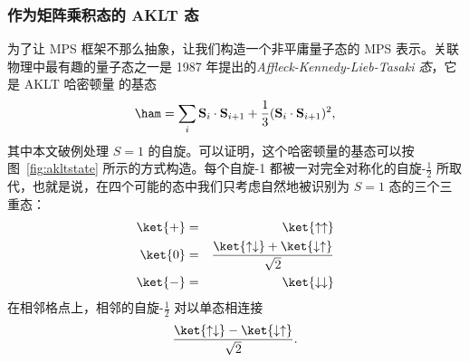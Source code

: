 \subsubsection{作为矩阵乘积态的 AKLT 态}
为了让 MPS 框架不那么抽象，让我们构造一个非平庸量子态的 MPS 表示。关联物理中最有趣的量子态之一是 1987 年提出的{\em Affleck-Kennedy-Lieb-Tasaki 态}，它是 AKLT 哈密顿量\cite{Affleck87,Affleck88} 的基态
\begin{equation}
\ham = \sum_{i} {\bf S}_i \cdot {\bf S}_{i+1} + 
\frac{1}{3} ({\bf S}_i \cdot {\bf S}_{i+1})^2 , 
\label{eq:aklt_hamiltonian}
\end{equation}
其中本文破例处理 $S=1$ 的自旋。可以证明，这个哈密顿量的基态可以按图~\ref{fig:akltstate} 所示的方式构造。每个自旋-1 都被一对完全对称化的自旋-$\frac{1}{2}$ 所取代，也就是说，在四个可能的态中我们只考虑自然地被识别为 $S=1$ 态的三个三重态：
\begin{eqnarray}
\ket{+}&=&\ket{\uparrow\uparrow} \nonumber \\
\ket{0}&=&\frac{\ket{\uparrow\downarrow}+\ket{\downarrow\uparrow}}{\sqrt{2}} 
\label{eq:tripletmapping} \\
\ket{-}&=&\ket{\downarrow\downarrow} \nonumber
\end{eqnarray}
在相邻格点上，相邻的自旋-$\frac{1}{2}$ 对以单态相连接
\begin{equation}
\frac{\ket{\uparrow\downarrow}-\ket{\downarrow\uparrow}}{\sqrt{2}} .
\end{equation}

